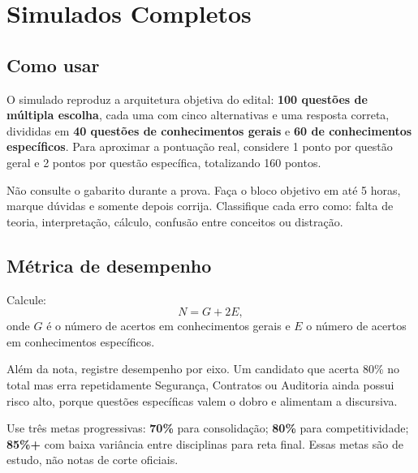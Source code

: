 \chapter{Simulados Completos}

\section{Como usar}

O simulado reproduz a arquitetura objetiva do edital: \textbf{100 questões de múltipla escolha}, cada uma com cinco alternativas e uma resposta correta, divididas em \textbf{40 questões de conhecimentos gerais} e \textbf{60 de conhecimentos específicos}. Para aproximar a pontuação real, considere 1 ponto por questão geral e 2 pontos por questão específica, totalizando 160 pontos.

\begin{atencao}
Não consulte o gabarito durante a prova. Faça o bloco objetivo em até 5 horas, marque dúvidas e somente depois corrija. Classifique cada erro como: falta de teoria, interpretação, cálculo, confusão entre conceitos ou distração.
\end{atencao}



\clearpage


\section{Métrica de desempenho}

Calcule:
\[
N = G + 2E,
\]
onde $G$ é o número de acertos em conhecimentos gerais e $E$ o número de acertos em conhecimentos específicos.

Além da nota, registre desempenho por eixo. Um candidato que acerta 80\% no total mas erra repetidamente Segurança, Contratos ou Auditoria ainda possui risco alto, porque questões específicas valem o dobro e alimentam a discursiva.

\begin{resumo}
Use três metas progressivas: \textbf{70\%} para consolidação; \textbf{80\%} para competitividade; \textbf{85\%+} com baixa variância entre disciplinas para reta final. Essas metas são de estudo, não notas de corte oficiais.
\end{resumo}
